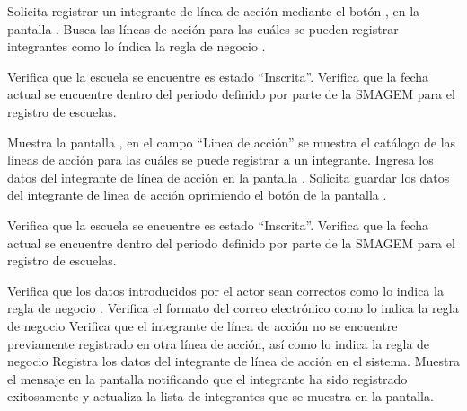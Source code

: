 \begin{UCtrayectoria}
    \UCpaso[\UCactor] Solicita registrar un integrante de línea de acción mediante el botón , en la pantalla .
   \UCpaso[\UCsist] Busca las líneas de acción para las cuáles se pueden registrar integrantes como lo índica la regla de negocio .
   
    \UCpaso[\UCsist] Verifica que la escuela se encuentre es estado ``Inscrita''. 
    \UCpaso[\UCsist] Verifica que la fecha actual se encuentre dentro del periodo definido por parte de la SMAGEM para el registro de escuelas.        
   
    \UCpaso[\UCsist] Muestra la pantalla , en el campo ``Linea de acción'' se muestra el catálogo de las líneas de acción para las cuáles se puede registrar a un integrante.
    \UCpaso[\UCactor] Ingresa los datos del integrante de línea de acción en la pantalla . \label{cur14:Acciones}
    \UCpaso[\UCactor] Solicita guardar los datos del integrante de línea de acción oprimiendo el botón  de la pantalla . 
    
    \UCpaso[\UCsist] Verifica que la escuela se encuentre es estado ``Inscrita''. 
    \UCpaso[\UCsist] Verifica que la fecha actual se encuentre dentro del periodo definido por parte de la SMAGEM para el registro de escuelas.         
    
    \UCpaso[\UCsist] Verifica que los datos introducidos por el actor sean correctos como lo indica la regla de negocio .    
   \UCpaso[\UCsist] Verifica el formato del correo electrónico como lo indica la regla de negocio   
   \UCpaso[\UCsist] Verifica que el integrante de línea de acción no se encuentre previamente registrado en otra línea de acción, así como lo indica la regla de negocio      
    \UCpaso[\UCsist] Registra los datos del integrante de línea de acción en el sistema.
    \UCpaso[\UCsist] Muestra el mensaje  en la pantalla  notificando que el integrante ha sido registrado exitosamente y actualiza la lista de integrantes que se muestra en la pantalla.
 \end{UCtrayectoria}

